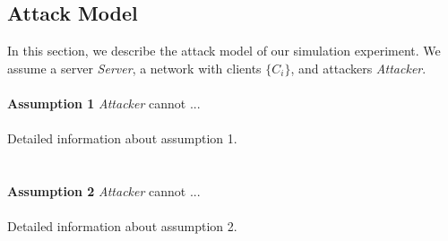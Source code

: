 \subsection{Attack Model}
In this section, we describe the attack model of our simulation experiment. We assume a server \emph{Server}, a network with clients \emph{$\{C_i\}$}, and attackers \emph{Attacker}.
\\
\\
\noindent \textbf{Assumption 1} \indent \emph{Attacker} cannot ...
\\
\\
Detailed information about assumption 1.
\\
\\
\\
\noindent \textbf{Assumption 2} \indent \emph{Attacker} cannot ...
\\
\\
Detailed information about assumption 2.